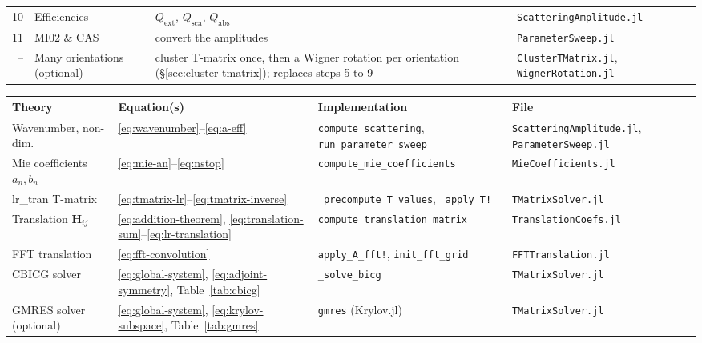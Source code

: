 \documentclass[11pt,a4paper]{article}
\begin{document}
\begin{center}
\begin{tabular}{@{} r >{\raggedright\arraybackslash}p{3.0cm} >{\raggedright\arraybackslash}p{7.6cm} >{\raggedright\arraybackslash}p{4.2cm} @{}}
  10 & Efficiencies & $Q_\mathrm{ext}$, $Q_\mathrm{sca}$, $Q_\mathrm{abs}$ & \texttt{ScatteringAmplitude.jl} \\
  11 & MI02 \& CAS & convert the amplitudes & \texttt{ParameterSweep.jl} \\
  \midrule
  -- & Many orientations (optional) & cluster T-matrix once, then a Wigner rotation per orientation (\S\ref{sec:cluster-tmatrix}); replaces steps 5 to 9 & \texttt{ClusterTMatrix.jl}, \texttt{WignerRotation.jl} \\
  \bottomrule
\end{tabular}
\end{center}

\label{sec:mapping}

\begin{center}
\footnotesize
\let\origunderscore\_
\renewcommand{\_}{\origunderscore\allowbreak}
\begin{tabular}{@{} >{\raggedright\arraybackslash}p{3.5cm} >{\raggedright\arraybackslash}p{2.9cm} >{\raggedright\arraybackslash}p{4.7cm} >{\raggedright\arraybackslash}p{4.4cm} @{}}
  \toprule
  Theory & Equation(s) & Implementation & File \\
  \midrule
  Wavenumber, non-dim. & \eqref{eq:wavenumber}--\eqref{eq:a-eff} & \texttt{compute\_scattering}, \texttt{run\_parameter\_sweep} & \texttt{ScatteringAmplitude.jl}, \texttt{ParameterSweep.jl} \\
  Mie coefficients $a_n, b_n$ & \eqref{eq:mie-an}--\eqref{eq:nstop} & \texttt{compute\_mie\_coefficients} & \texttt{MieCoefficients.jl} \\
  lr\_tran T-matrix & \eqref{eq:tmatrix-lr}--\eqref{eq:tmatrix-inverse} & \texttt{\_precompute\_T\_values}, \texttt{\_apply\_T!} & \texttt{TMatrixSolver.jl} \\
  Translation $\mathbf{H}_{ij}$ & \eqref{eq:addition-theorem}, \eqref{eq:translation-sum}--\eqref{eq:lr-translation} & \texttt{compute\_translation\_matrix} & \texttt{TranslationCoefs.jl} \\
  FFT translation & \eqref{eq:fft-convolution} & \texttt{apply\_A\_fft!}, \texttt{init\_fft\_grid} & \texttt{FFTTranslation.jl} \\
  CBICG solver & \eqref{eq:global-system}, \eqref{eq:adjoint-symmetry}, Table~\ref{tab:cbicg} & \texttt{\_solve\_bicg} & \texttt{TMatrixSolver.jl} \\
  GMRES solver (optional) & \eqref{eq:global-system}, \eqref{eq:krylov-subspace}, Table~\ref{tab:gmres} & \texttt{gmres} (Krylov.jl) & \texttt{TMatrixSolver.jl} \\

\end{tabular}
\end{center}
\end{document}
